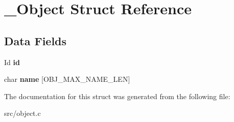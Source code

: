 \hypertarget{struct__Object}{}\section{\+\_\+\+Object Struct Reference}
\label{struct__Object}
\subsection*{Data Fields}
\begin{DoxyCompactItemize}
\item 
\mbox{\label{struct__Object_a3cff7a0e8dc4e9d23895ed9af1b7653a}} 
Id {\bfseries id}
\item 
\mbox{\label{struct__Object_a9cb87156f0fc0949a1fc8bc0e7ee2447}} 
char {\bfseries name} \mbox{[}O\+B\+J\+\_\+\+M\+A\+X\+\_\+\+N\+A\+M\+E\+\_\+\+L\+EN\mbox{]}
\end{DoxyCompactItemize}


The documentation for this struct was generated from the following file\+:\begin{DoxyCompactItemize}
\item 
src/object.\+c\end{DoxyCompactItemize}
